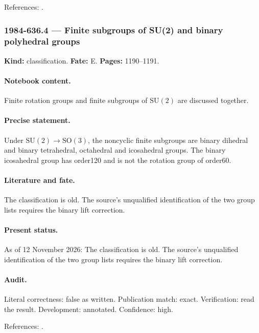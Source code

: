 \noindent References: \citep{griffithsharris1980special}.\par

\subsubsection{1984-636.4 --- Finite subgroups of SU(2) and binary polyhedral groups}

\label{item:1984-636.4}

\noindent\textbf{Kind:} classification. \textbf{Fate:} E. \textbf{Pages:} 1190--1191.\par

\paragraph{Notebook content.} Finite rotation groups and finite subgroups of \(\mathrm{SU}(2)\) are discussed together.

\paragraph{Precise statement.} Under \(\mathrm{SU}(2)\to\mathrm{SO}(3)\), the noncyclic finite subgroups are binary dihedral and binary tetrahedral, octahedral and icosahedral groups. The binary icosahedral group has order120 and is not the rotation group of order60.

\paragraph{Literature and fate.} The classification is old. The source's unqualified identification of the two group lists requires the binary lift correction.

\paragraph{Present status.} As of 12 November 2026: The classification is old. The source's unqualified identification of the two group lists requires the binary lift correction.

\paragraph{Audit.} Literal correctness: false as written. Publication match: exact. Verification: read the result. Development: annotated. Confidence: high.

\noindent References: \citep{mckay1980graphs}.\par

